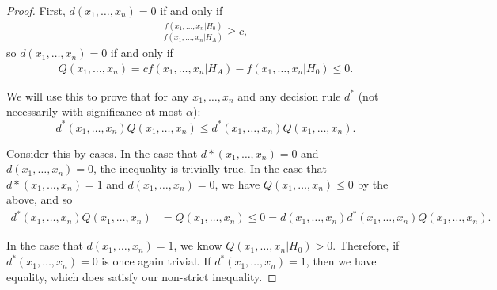 \begin{proof}
    First, $d(x_1, \ldots, x_n) = 0$ if and only if
    \begin{align*}
        \frac{f(x_1, \ldots, x_n|H_0)}{f(x_1, \ldots, x_n|H_A)} \geq c,
    \end{align*}
    so $d(x_1, \ldots, x_n) = 0$ if and only if
    \begin{align*}
        Q(x_1, \ldots, x_n) = cf(x_1, \ldots, x_n|H_A) - f(x_1, \ldots, x_n|H_0) \leq 0.
    \end{align*}

    We will use this to prove that for any $x_1, \ldots, x_n$ and any decision rule $d^{*}$ (not necessarily with significance at most $\alpha$):
    \begin{equation}\tag{$\star$}\label{neyman-pearson-inequality}
        d^{*}(x_1, \ldots, x_n)Q(x_1, \ldots, x_n) \leq d^{*}(x_1, \ldots, x_n)Q(x_1, \ldots, x_n).
    \end{equation}

    Consider this by cases. In the case that $d*(x_1, \ldots, x_n) = 0$ and $d(x_1, \ldots, x_n) = 0$, the inequality is trivially true. In the case that $d*(x_1, \ldots, x_n) = 1$ and $d(x_1, \ldots, x_n) = 0$, we have $Q(x_1, \ldots, x_n) \leq 0$ by the above, and so
    \begin{align*}
        d^{*}(x_1, \ldots, x_n)Q(x_1, \ldots, x_n) &= Q(x_1, \ldots, x_n) \leq 0 = d(x_1, \ldots, x_n)d^{*}(x_1, \ldots, x_n)Q(x_1, \ldots, x_n).
    \end{align*}

    In the case that $d(x_1, \ldots, x_n) = 1$, we know $Q(x_1, \ldots, x_n|H_0) > 0$. Therefore, if $d^{*}(x_1, \ldots, x_n) = 0$ is once again trivial. If $d^{*}(x_1, \ldots, x_n) = 1$, then we have equality, which does satisfy our non-strict inequality.


\end{proof}
